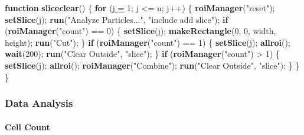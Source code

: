 \documentclass[11pt,singlespacinge,twoside]{reedthesis} %
\newenvironment{Shaded}{}{}
\newcommand{\ControlFlowTok}[1]{\textbf{#1}}
\newcommand{\DataTypeTok}[1]{\underline{#1}}
\newcommand{\DecValTok}[1]{#1}
\newcommand{\KeywordTok}[1]{\textbf{#1}}
\newcommand{\NormalTok}[1]{#1}
\newcommand{\OperatorTok}[1]{#1}
\newcommand{\StringTok}[1]{#1}
\theoremstyle{definition}
\theoremstyle{definition}
\theoremstyle{definition}
\theoremstyle{remark}
\begin{document}
\scriptsize
\begin{Shaded}
\begin{Highlighting}[numbers=left,,]
\ControlFlowTok{function} \KeywordTok{sliceclear}\NormalTok{() \{}
  \ControlFlowTok{for}\NormalTok{ (}\DataTypeTok{j =} \DecValTok{1}\NormalTok{; j }\OperatorTok{<=}\StringTok{ }\NormalTok{n; j}\OperatorTok{++}\NormalTok{) \{}
    \KeywordTok{roiManager}\NormalTok{(}\StringTok{"reset"}\NormalTok{);}
    \KeywordTok{setSlice}\NormalTok{(j);}
    \KeywordTok{run}\NormalTok{(}\StringTok{"Analyze Particles..."}\NormalTok{, }\StringTok{"include add slice"}\NormalTok{);}
    \ControlFlowTok{if}\NormalTok{ (}\KeywordTok{roiManager}\NormalTok{(}\StringTok{"count"}\NormalTok{) }\OperatorTok{==}\StringTok{ }\DecValTok{0}\NormalTok{) \{}
        \KeywordTok{setSlice}\NormalTok{(j);}
        \KeywordTok{makeRectangle}\NormalTok{(}\DecValTok{0}\NormalTok{, }\DecValTok{0}\NormalTok{, width, height);}
        \KeywordTok{run}\NormalTok{(}\StringTok{"Cut"}\NormalTok{);}
\NormalTok{    \}}
    \ControlFlowTok{if}\NormalTok{ (}\KeywordTok{roiManager}\NormalTok{(}\StringTok{"count"}\NormalTok{) }\OperatorTok{==}\StringTok{ }\DecValTok{1}\NormalTok{) \{}
        \KeywordTok{setSlice}\NormalTok{(j);}
        \KeywordTok{allroi}\NormalTok{();}
        \KeywordTok{wait}\NormalTok{(}\DecValTok{200}\NormalTok{);}
        \KeywordTok{run}\NormalTok{(}\StringTok{"Clear Outside"}\NormalTok{, }\StringTok{"slice"}\NormalTok{);}
\NormalTok{    \}}
    \ControlFlowTok{if}\NormalTok{ (}\KeywordTok{roiManager}\NormalTok{(}\StringTok{"count"}\NormalTok{) }\OperatorTok{>}\StringTok{ }\DecValTok{1}\NormalTok{) \{}
        \KeywordTok{setSlice}\NormalTok{(j);}
        \KeywordTok{allroi}\NormalTok{();}
        \KeywordTok{roiManager}\NormalTok{(}\StringTok{"Combine"}\NormalTok{);}
        \KeywordTok{run}\NormalTok{(}\StringTok{"Clear Outside"}\NormalTok{, }\StringTok{"slice"}\NormalTok{);}
\NormalTok{    \}}
\NormalTok{  \}}
\NormalTok{\}}
\end{Highlighting}
\end{Shaded}
\normalsize

\hypertarget{data-analysis-1}{%
\subsubsection{Data Analysis}\label{data-analysis-1}}

\hypertarget{cell-count}{%
\paragraph{Cell Count}\label{cell-count}}
\end{document}
